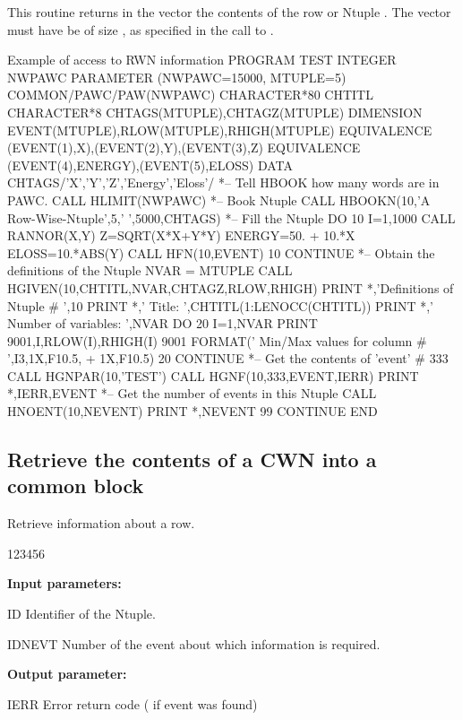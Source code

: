 This routine returns in the vector  the contents of the 
row  or Ntuple . 
The vector  must have be of size ,
as specified in the call to .

\begin{XMPt}{Example of access to RWN information}
\NODOC{\baselineskip=.95\baselineskip\relax}      PROGRAM TEST
      INTEGER    NWPAWC
      PARAMETER (NWPAWC=15000, MTUPLE=5)
      COMMON/PAWC/PAW(NWPAWC)
      CHARACTER*80 CHTITL
      CHARACTER*8 CHTAGS(MTUPLE),CHTAGZ(MTUPLE)
      DIMENSION EVENT(MTUPLE),RLOW(MTUPLE),RHIGH(MTUPLE)
      EQUIVALENCE (EVENT(1),X),(EVENT(2),Y),(EVENT(3),Z)
      EQUIVALENCE (EVENT(4),ENERGY),(EVENT(5),ELOSS)
      DATA CHTAGS/'X','Y','Z','Energy','Eloss'/
*-- Tell HBOOK how many words are in PAWC.
      CALL HLIMIT(NWPAWC)
*-- Book Ntuple 
      CALL HBOOKN(10,'A Row-Wise-Ntuple',5,' ',5000,CHTAGS)
*-- Fill the Ntuple 
      DO 10 I=1,1000
         CALL RANNOR(X,Y)
         Z=SQRT(X*X+Y*Y)
         ENERGY=50. + 10.*X
         ELOSS=10.*ABS(Y)
         CALL HFN(10,EVENT)
 10   CONTINUE
*--   Obtain the definitions of the Ntuple
      NVAR = MTUPLE
      CALL HGIVEN(10,CHTITL,NVAR,CHTAGZ,RLOW,RHIGH)
      PRINT *,'Definitions of Ntuple # ',10
      PRINT *,'   Title: ',CHTITL(1:LENOCC(CHTITL))
      PRINT *,'   Number of variables: ',NVAR
      DO 20 I=1,NVAR
         PRINT 9001,I,RLOW(I),RHIGH(I)
9001  FORMAT(' Min/Max values for column # ',I3,1X,F10.5,
     +       1X,F10.5)
 20   CONTINUE
*--   Get the contents of 'event' # 333
      CALL HGNPAR(10,'TEST')
      CALL HGNF(10,333,EVENT,IERR)
      PRINT *,IERR,EVENT
*--   Get the number of events in this Ntuple
      CALL HNOENT(10,NEVENT)
      PRINT *,NEVENT
 99   CONTINUE
      END
\end{XMPt}

\newpage%

\subsection{Retrieve the contents of a CWN into a common block}
 
 
\Action

Retrieve information about a \CWN{} row.
 
\begin{DLtt}{123456}
\item[{\rm\bf Input parameters:}]
\item[ID] Identifier of the Ntuple.
\item[IDNEVT] Number of the event about which information is required.
\item[{\rm\bf Output parameter:}]
\item[IERR] Error return code ( if event was found)
\end{DLtt}

